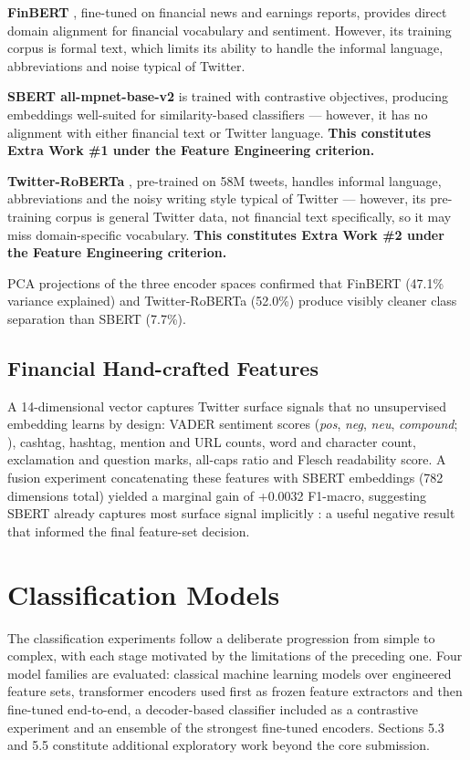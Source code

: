 \documentclass[11pt,a4paper]{article}
\begin{document}
\textbf{FinBERT} \cite{araci2019finbert}, fine-tuned on financial news and earnings reports, provides
direct domain alignment for financial vocabulary and sentiment. However, its training corpus
is formal text, which limits its ability to handle the informal language, abbreviations and
noise typical of Twitter.

\textbf{SBERT all-mpnet-base-v2} \cite{reimers2019sentencebert} is trained with contrastive
objectives, producing embeddings well-suited for similarity-based classifiers — however, it
has no alignment with either financial text or Twitter language.
\textbf{This constitutes Extra Work \#1 under the Feature Engineering criterion.}

\textbf{Twitter-RoBERTa} \cite{barbieri2020tweeteval}, pre-trained on 58M tweets, handles informal
language, abbreviations and the noisy writing style typical of Twitter — however, its
pre-training corpus is general Twitter data, not financial text specifically, so it may miss
domain-specific vocabulary.
\textbf{This constitutes \textbf{Extra Work} \#2 under the Feature Engineering criterion.}

PCA projections of the three encoder spaces confirmed that FinBERT (47.1\% variance explained)
and Twitter-RoBERTa (52.0\%) produce visibly cleaner class separation than SBERT (7.7\%).

\subsection{Financial Hand-crafted Features}

A 14-dimensional vector captures Twitter surface signals that no unsupervised embedding learns
by design: VADER sentiment scores (\textit{pos}, \textit{neg}, \textit{neu}, \textit{compound};
\cite{hutto2014vader}), cashtag, hashtag, mention and URL counts, word and character count,
exclamation and question marks, all-caps ratio and Flesch readability score. A fusion
experiment concatenating these features with SBERT embeddings (782 dimensions total) yielded
a marginal gain of +0.0032 F1-macro, suggesting SBERT already captures most surface signal
implicitly : a useful negative result that informed the final feature-set decision.

\section{Classification Models}
The classification experiments follow a deliberate progression from simple to complex, with each stage motivated by the limitations of the preceding one. Four model families are evaluated: classical machine learning models over engineered feature sets, transformer encoders used first as frozen feature extractors and then fine-tuned end-to-end, a decoder-based classifier included as a contrastive experiment and an ensemble of the strongest fine-tuned encoders. Sections 5.3 and 5.5 constitute additional exploratory work beyond the core submission.
\end{document}
